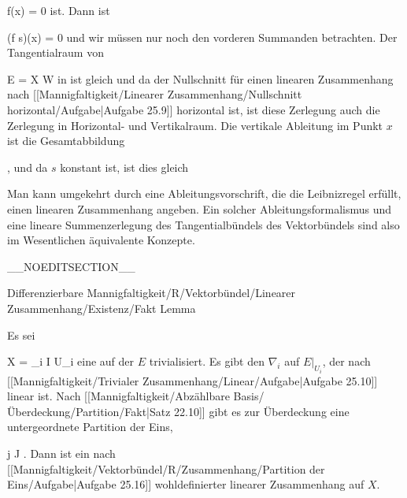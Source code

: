 {\mavergleichskette
{\vergleichskette
{ f(x)
}
{ = }{ 0
}
{  }{
}
{    }{
}
{   }{
}
}
{}{}{}
ist. Dann ist

\mavergleichskette
{\vergleichskette
{ (f \nabla s)(x)
}
{ = }{ 0
}
{  }{
}
{    }{
}
{   }{
}
}
{}{}{}
und wir müssen nur noch den vorderen Summanden betrachten. Der Tangentialraum von

\mavergleichskette
{\vergleichskette
{ E
}
{ = }{ X \times W
}
{  }{
}
{    }{
}
{   }{
}
}
{}{}{}
in
 ist gleich
 und da der Nullschnitt für einen linearen Zusammenhang nach
[[Mannigfaltigkeit/Linearer Zusammenhang/Nullschnitt horizontal/Aufgabe|Aufgabe 25.9]]
horizontal ist, ist diese Zerlegung auch die Zerlegung in Horizontal- und Vertikalraum. Die vertikale Ableitung
 im Punkt $x$ ist die Gesamtabbildung

 { , }
 und da $s$ konstant ist, ist dies gleich

}

Man kann umgekehrt durch eine Ableitungsvorschrift, die die Leibnizregel erfüllt, einen linearen Zusammenhang angeben. Ein solcher Ableitungsformalismus und eine lineare Summenzerlegung des Tangentialbündels des Vektorbündels sind also im Wesentlichen äquivalente Konzepte.

__NOEDITSECTION__

{Differenzierbare Mannigfaltigkeit/R/Vektorbündel/Linearer Zusammenhang/Existenz/Fakt}
{Lemma}
{}
{

\faktzusatz {}
\faktzusatz {}

}
{

Es sei

\mavergleichskette
{\vergleichskette
{ X
}
{ = }{ \bigcup_{i \in I} U_i
}
{  }{
}
{    }{
}
{   }{
}
}
{}{}{}
eine
auf der $E$ trivialisiert. Es gibt den
$\nabla_i$  auf $E\vert_{U_i }$, der nach
[[Mannigfaltigkeit/Trivialer Zusammenhang/Linear/Aufgabe|Aufgabe 25.10]]
linear ist. Nach
[[Mannigfaltigkeit/Abzählbare Basis/Überdeckung/Partition/Fakt|Satz 22.10]]
gibt es zur Überdeckung eine untergeordnete Partition der Eins,

 {}
 {j \in J} {}
 {} {} {} {.}
Dann ist
 ein nach
[[Mannigfaltigkeit/Vektorbündel/R/Zusammenhang/Partition der Eins/Aufgabe|Aufgabe 25.16]]
wohldefinierter linearer Zusammenhang auf $X$.

}

